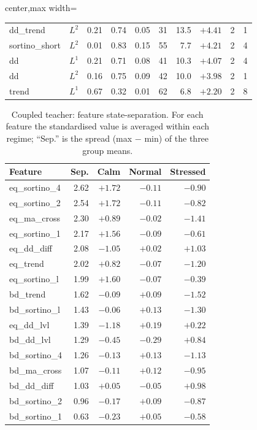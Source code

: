 \begin{table}[H]
\begin{adjustbox}{center,max width=\linewidth}
\begin{tabular}{llrrrrrrrr}
dd\_trend & $L^2$ & 0.21 & 0.74 & 0.05 & 31 & 13.5 & $+4.41$ & 2 & 1 \\
sortino\_short & $L^2$ & 0.01 & 0.83 & 0.15 & 55 & \phantom{0}7.7 & $+4.21$ & 2 & 4 \\
dd & $L^1$ & 0.21 & 0.71 & 0.08 & 41 & 10.3 & $+4.07$ & 2 & 4 \\
dd & $L^2$ & 0.16 & 0.75 & 0.09 & 42 & 10.0 & $+3.98$ & 2 & 1 \\
trend & $L^1$ & 0.67 & 0.32 & 0.01 & 62 & \phantom{0}6.8 & $+2.20$ & 2 & 8 \\
\bottomrule
\end{tabular}
\end{adjustbox}
\end{table}

\begin{table}[H]
\centering\small
\caption{Coupled teacher: feature state-separation. For each feature the standardised value
is averaged within each regime; ``Sep.'' is the spread (max $-$ min) of the three group
means.}
\label{tab:c-featsep}
\begin{tabular}{lrrrr}
\toprule
Feature & Sep. & Calm & Normal & Stressed \\
\midrule
eq\_sortino\_4 & 2.62 & $+1.72$ & $-0.11$ & $-0.90$ \\
eq\_sortino\_2 & 2.54 & $+1.72$ & $-0.11$ & $-0.82$ \\
eq\_ma\_cross & 2.30 & $+0.89$ & $-0.02$ & $-1.41$ \\
eq\_sortino\_1 & 2.17 & $+1.56$ & $-0.09$ & $-0.61$ \\
eq\_dd\_diff & 2.08 & $-1.05$ & $+0.02$ & $+1.03$ \\
eq\_trend & 2.02 & $+0.82$ & $-0.07$ & $-1.20$ \\
eq\_sortino\_l & 1.99 & $+1.60$ & $-0.07$ & $-0.39$ \\
bd\_trend & 1.62 & $-0.09$ & $+0.09$ & $-1.52$ \\
bd\_sortino\_l & 1.43 & $-0.06$ & $+0.13$ & $-1.30$ \\
eq\_dd\_lvl & 1.39 & $-1.18$ & $+0.19$ & $+0.22$ \\
bd\_dd\_lvl & 1.29 & $-0.45$ & $-0.29$ & $+0.84$ \\
bd\_sortino\_4 & 1.26 & $-0.13$ & $+0.13$ & $-1.13$ \\
bd\_ma\_cross & 1.07 & $-0.11$ & $+0.12$ & $-0.95$ \\
bd\_dd\_diff & 1.03 & $+0.05$ & $-0.05$ & $+0.98$ \\
bd\_sortino\_2 & 0.96 & $-0.17$ & $+0.09$ & $-0.87$ \\
bd\_sortino\_1 & 0.63 & $-0.23$ & $+0.05$ & $-0.58$ \\
\bottomrule
\end{tabular}
\end{table}

